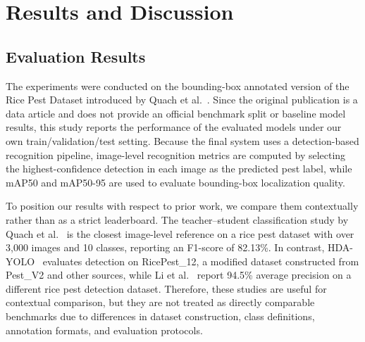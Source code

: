 ﻿\documentclass[11pt]{article}
\begin{document}
\section{Results and Discussion}
\label{sec:results}

\subsection{Evaluation Results}

The experiments were conducted on the bounding-box annotated version of the Rice Pest Dataset introduced by Quach et al.~\cite{quach2024rice}. Since the original publication is a data article and does not provide an official benchmark split or baseline model results, this study reports the performance of the evaluated models under our own train/validation/test setting. Because the final system uses a detection-based recognition pipeline, image-level recognition metrics are computed by selecting the highest-confidence detection in each image as the predicted pest label, while mAP50 and mAP50-95 are used to evaluate bounding-box localization quality.

\begin{table}[h]
\centering
\caption{Performance of the evaluated YOLO models on the bounding-box annotated Rice Pest Dataset. Bold values indicate the best result among our evaluated models.}
\label{tab:test}
\scriptsize
{}
\end{table}

To position our results with respect to prior work, we compare them contextually rather than as a strict leaderboard. The teacher--student classification study by Quach et al.~\cite{quach2026xai} is the closest image-level reference on a rice pest dataset with over 3,000 images and 10 classes, reporting an F1-score of 82.13\%. In contrast, HDA-YOLO~\cite{yuan2026hda} evaluates detection on RicePest\_12, a modified dataset constructed from Pest\_V2 and other sources, while Li et al.~\cite{li2025yolomslp} report 94.5\% average precision on a different rice pest detection dataset. Therefore, these studies are useful for contextual comparison, but they are not treated as directly comparable benchmarks due to differences in dataset construction, class definitions, annotation formats, and evaluation protocols.
\end{document}
